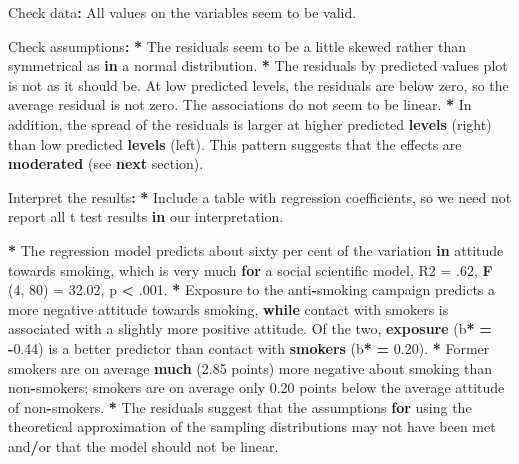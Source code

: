\documentclass[a4paper]{book}
\newenvironment{Shaded}{\begin{snugshade}}{\end{snugshade}}
\newcommand{\KeywordTok}[1]{\textcolor[rgb]{0,0,0}{\textbf{#1}}}
\newcommand{\DecValTok}[1]{\textcolor[rgb]{0.00,0.00,0.00}{#1}}
\newcommand{\FloatTok}[1]{\textcolor[rgb]{0.00,0.00,0.00}{#1}}
\newcommand{\StringTok}[1]{\textcolor[rgb]{0.00,0.00,0.00}{#1}}
\newcommand{\ControlFlowTok}[1]{\textcolor[rgb]{0.00,0.00,0.00}{\textbf{#1}}}
\newcommand{\OperatorTok}[1]{\textcolor[rgb]{0.00,0.00,0.00}{\textbf{#1}}}
\newcommand{\ErrorTok}[1]{\textcolor[rgb]{0.00,0.00,0.00}{\textbf{#1}}}
\newcommand{\NormalTok}[1]{#1}
\theoremstyle{definition}
\theoremstyle{definition}
\theoremstyle{definition}
\theoremstyle{remark}
\begin{document}
\begin{Shaded}
\begin{Highlighting}[]
\NormalTok{Check data}\OperatorTok{:}\StringTok{  }
\StringTok{  }
\NormalTok{All values on the variables seem to be valid.  }
  
\NormalTok{Check assumptions}\OperatorTok{:}\StringTok{  }
\StringTok{  }
\ErrorTok{*}\StringTok{ }\NormalTok{The residuals seem to be a little skewed rather than symmetrical as }\ControlFlowTok{in}\NormalTok{ a}
\NormalTok{normal distribution.}
\OperatorTok{*}\StringTok{ }\NormalTok{The residuals by predicted values plot is not as it should be. At low}
\NormalTok{predicted levels, the residuals are below zero, so the average residual is not}
\NormalTok{zero. The associations do not seem to be linear.}
\OperatorTok{*}\StringTok{ }\NormalTok{In addition, the spread of the residuals is larger at higher predicted}
\KeywordTok{levels}\NormalTok{ (right) than low predicted }\KeywordTok{levels}\NormalTok{ (left). This pattern suggests that}
\NormalTok{the effects are }\KeywordTok{moderated}\NormalTok{ (see }\ControlFlowTok{next}\NormalTok{ section).}
  
\NormalTok{Interpret the results}\OperatorTok{:}\StringTok{  }
\StringTok{  }
\ErrorTok{*}\StringTok{ }\NormalTok{Include a table with regression coefficients, so we need not report all t}
\NormalTok{test results }\ControlFlowTok{in}\NormalTok{ our interpretation.}
  
\OperatorTok{*}\StringTok{ }\NormalTok{The regression model predicts about sixty per cent of the variation }\ControlFlowTok{in}
\NormalTok{attitude towards smoking, which is very much }\ControlFlowTok{for}\NormalTok{ a social scientific model, R2}
\NormalTok{=}\StringTok{ }\NormalTok{.}\DecValTok{62}\NormalTok{, }\KeywordTok{F}\NormalTok{ (}\DecValTok{4}\NormalTok{, }\DecValTok{80}\NormalTok{) =}\StringTok{ }\FloatTok{32.02}\NormalTok{, p }\OperatorTok{<}\StringTok{ }\NormalTok{.}\DecValTok{001}\NormalTok{.}
\OperatorTok{*}\StringTok{ }\NormalTok{Exposure to the anti}\OperatorTok{-}\NormalTok{smoking campaign predicts a more negative attitude}
\NormalTok{towards smoking, }\ControlFlowTok{while}\NormalTok{ contact with smokers is associated with a slightly more}
\NormalTok{positive attitude. Of the two, }\KeywordTok{exposure}\NormalTok{ (b}\OperatorTok{*}\StringTok{ }\ErrorTok{=}\StringTok{ }\OperatorTok{-}\FloatTok{0.44}\NormalTok{) is a better predictor}
\NormalTok{than contact with }\KeywordTok{smokers}\NormalTok{ (b}\OperatorTok{*}\StringTok{ }\ErrorTok{=}\StringTok{ }\FloatTok{0.20}\NormalTok{).}
\OperatorTok{*}\StringTok{ }\NormalTok{Former smokers are on average }\KeywordTok{much}\NormalTok{ (}\FloatTok{2.85}\NormalTok{ points) more negative about smoking}
\NormalTok{than non}\OperatorTok{-}\NormalTok{smokers; smokers are on average only }\FloatTok{0.20}\NormalTok{ points below the}
\NormalTok{average attitude of non}\OperatorTok{-}\NormalTok{smokers.}
\OperatorTok{*}\StringTok{ }\NormalTok{The residuals suggest that the assumptions }\ControlFlowTok{for}\NormalTok{ using the theoretical}
\NormalTok{approximation of the sampling distributions may not have been met and}\OperatorTok{/}\NormalTok{or that}
\NormalTok{the model should not be linear.}
\end{Highlighting}
\end{Shaded}
\end{document}
